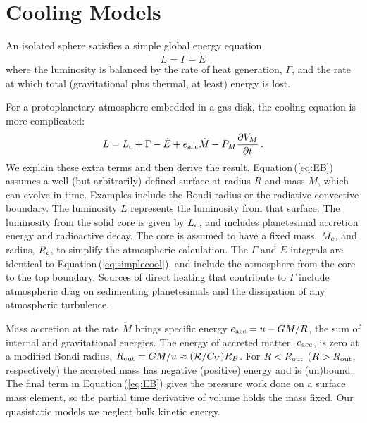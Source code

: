 \documentclass[12pt, preprint,numberedappendix]{emulateapj}
\newcommand{\p}{\partial}
\newcommand{\Eq}[1]{Equation\,(\ref{#1})}
\newcommand{\Rg}{\mathcal{R}}
\newcommand{\co}{_{\rm c}}
\newcommand{\surf}{_M}
\begin{document}

\section{Cooling Models}
An isolated sphere satisfies a simple global energy equation
\begin{equation}\label{eq:simplecool}
L = \Gamma - \dot{E}
\end{equation} 
where the luminosity is balanced by the rate of heat generation, $\Gamma$, and the rate at which total (gravitational plus thermal, at least) energy is lost.

For a protoplanetary atmosphere embedded in a gas disk, the cooling equation is more complicated: 
\begin{equation}\label{eq:EB}
L = L\co + \Gamma- \dot{E} + e_{\rm acc} \dot{M}  -  P\surf {\p V\surf \over \p t} \, .
\end{equation}
We explain these extra terms and then derive the result.   \Eq{eq:EB} assumes a well (but arbitrarily) defined surface at radius $R$ and mass $M$, which can evolve in time.  Examples include the Bondi radius or the radiative-convective boundary.  The luminosity $L$ represents the luminosity from that surface.  The luminosity from the solid core is given by $L\co$, and includes planetesimal accretion energy  and radioactive decay.  The core is assumed to have a fixed mass, $M\co$, and radius, $R\co$, to simplify the atmospheric calculation.  The $\Gamma$ and $\dot{E}$ integrals are identical to \Eq{eq:simplecool}, and include the atmosphere from the core to the top boundary.   Sources of direct heating that  contribute to $\Gamma$ include  atmospheric drag on sedimenting planetesimals and the dissipation of any atmospheric turbulence.

Mass accretion at the rate $\dot{M}$ brings specific energy $e_{\rm acc} = u - GM/R$, the sum of internal and gravitational energies.  The energy of accreted matter, $e_{\rm acc}$, is  zero at a modified Bondi radius, $R_{\rm out} = G M/u \approx  (\Rg/C_V) R_B$.  For $R < R_{\rm out}$ ($R > R_{\rm out}$, respectively) the accreted mass has negative (positive) energy and is (un)bound.
 The final term in \Eq{eq:EB} gives the pressure work done on a surface mass element, so the partial time derivative of  volume holds the mass fixed.  Our quasistatic models we neglect bulk kinetic energy.   
\end{document}
